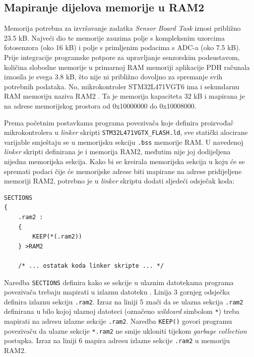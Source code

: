 \subsection{Mapiranje dijelova memorije u RAM2}

Memorija potrebna za izvršavanje zadatka \textit{Sensor Board Task} iznosi približno 23.5 kB. Najveći dio te memorije zauzima polje s kompleksnim uzorcima fotosenzora (oko 16 kB) i polje s primljenim podacima s ADC-a (oko 7.5 kB). Prije integracije programske potpore za upravljanje senzorskim podsustavom, količina slobodne memorije u primarnoj RAM memoriji aplikacije PDH računala iznosila je svega 3.8 kB, što nije ni približno dovoljno za spremanje svih potrebnih podataka. No, mikrokontroler STM32L471VGT6 ima i sekundarnu RAM memoriju naziva RAM2 \cite{stm32l4_manual}. Ta je memorija kapaciteta 32 kB i mapirana je na adrese memorijskog prostora od 0x10000000 do 0x10008000.

Prema početnim postavkama programa povezivača  koje definira proizvođač mikrokontrolera u \textit{linker} skripti \texttt{STM32L471VGTX\_FLASH.ld}, sve statički alocirane varijable smještaju se u memorijsku sekciju \texttt{.bss} memorije RAM. U navedenoj \textit{linker} skripti definirana je i memorija RAM2, međutim nije joj dodijeljena nijedna memorijska sekcija. Kako bi se kreirala memorijska sekcija u koju će se spremati podaci čije će memorijske adrese biti mapirane na adrese pridijeljene memoriji RAM2, potrebno je u \textit{linker} skriptu dodati sljedeći odsječak koda:

\begin{lstlisting}[caption={Smještanje memorijske sekcije \texttt{.ram2} u memoriju RAM2}]
SECTIONS
{
    .ram2 :
    {
        KEEP(*(.ram2))
    } >RAM2

    /* ... ostatak koda linker skripte ... */
\end{lstlisting}

Naredba \texttt{SECTIONS} definira kako se sekcije u ulaznim datotekama programa povezivača trebaju mapirati u izlaznu datoteku \cite{ld_dokumentacija}. Linija 3 gornjeg odsječka definira izlaznu sekciju \texttt{.ram2}. Izraz na liniji 5 znači da se ulazna sekcija \texttt{.ram2} definirana u bilo kojoj ulaznoj datoteci (označeno \textit{wildcard} simbolom \texttt{*}) treba mapirati na adresu izlazne sekcije \texttt{.ram2}. Naredba \texttt{KEEP()} govori programu povezivaču da ulazne sekcije \texttt{*.ram2} ne smije ukloniti tijekom \textit{garbage collection} postupka. Izraz na liniji 6 mapira adresu izlazne sekcije \texttt{.ram2} u memoriju RAM2.

